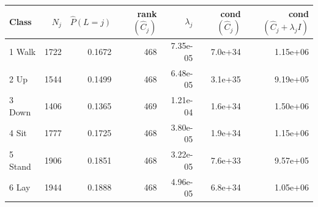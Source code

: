 \begin{tabular}{lrrrrrr}
\toprule
Class & $N_j$ & $\hat P(L{=}j)$ & rank$(\hat C_j)$ & $\lambda_j$ & cond$(\hat C_j)$ & cond$(\hat C_j+\lambda_j I)$ \\
\midrule
1 Walk & 1722 & 0.1672 & 468 & 7.35e-05 & 7.0e+34 & 1.15e+06 \\
2 Up & 1544 & 0.1499 & 468 & 6.48e-05 & 3.1e+35 & 9.19e+05 \\
3 Down & 1406 & 0.1365 & 469 & 1.21e-04 & 1.6e+34 & 1.50e+06 \\
4 Sit & 1777 & 0.1725 & 468 & 3.80e-05 & 1.9e+34 & 1.15e+06 \\
5 Stand & 1906 & 0.1851 & 468 & 3.22e-05 & 7.6e+33 & 9.57e+05 \\
6 Lay & 1944 & 0.1888 & 468 & 4.96e-05 & 6.8e+34 & 1.05e+06 \\
\bottomrule
\end{tabular}
